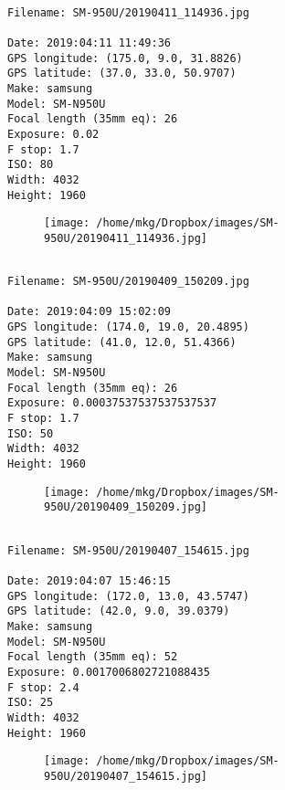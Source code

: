 
\clearpage
\onecolumn
\noindent 
\noindent
\begin{lstlisting}

Filename: SM-950U/20190411_114936.jpg

Date: 2019:04:11 11:49:36
GPS longitude: (175.0, 9.0, 31.8826)
GPS latitude: (37.0, 33.0, 50.9707)
Make: samsung
Model: SM-N950U
Focal length (35mm eq): 26
Exposure: 0.02
F stop: 1.7
ISO: 80
Width: 4032
Height: 1960
\end{lstlisting}
\clearpage

\begin{figure}
\texttt{[image: /home/mkg/Dropbox/images/SM-950U/20190411\_114936.jpg]}
\end{figure}
    
\clearpage
\onecolumn
\noindent 
\noindent
\begin{lstlisting}

Filename: SM-950U/20190409_150209.jpg

Date: 2019:04:09 15:02:09
GPS longitude: (174.0, 19.0, 20.4895)
GPS latitude: (41.0, 12.0, 51.4366)
Make: samsung
Model: SM-N950U
Focal length (35mm eq): 26
Exposure: 0.00037537537537537537
F stop: 1.7
ISO: 50
Width: 4032
Height: 1960
\end{lstlisting}
\clearpage

\begin{figure}
\texttt{[image: /home/mkg/Dropbox/images/SM-950U/20190409\_150209.jpg]}
\end{figure}
    
\clearpage
\onecolumn
\noindent 
\noindent
\begin{lstlisting}

Filename: SM-950U/20190407_154615.jpg

Date: 2019:04:07 15:46:15
GPS longitude: (172.0, 13.0, 43.5747)
GPS latitude: (42.0, 9.0, 39.0379)
Make: samsung
Model: SM-N950U
Focal length (35mm eq): 52
Exposure: 0.0017006802721088435
F stop: 2.4
ISO: 25
Width: 4032
Height: 1960
\end{lstlisting}
\clearpage

\begin{figure}
\texttt{[image: /home/mkg/Dropbox/images/SM-950U/20190407\_154615.jpg]}
\end{figure}
    
